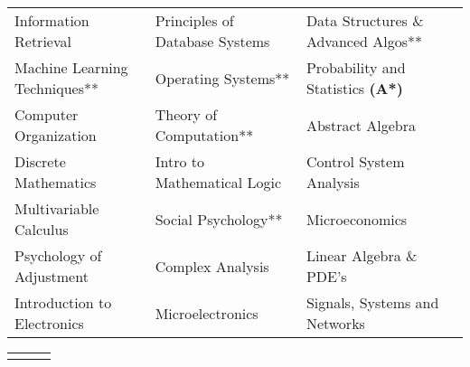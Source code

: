  {\fontsize{11pt}{1em}\bodyfontlight\upshape\color{text}
\begin{tabular*}{\textwidth}{L{\textwidth/3 - 0.5 cm} L{\textwidth/3 - 0.5 cm} L{\textwidth/3}}
  Information Retrieval & Principles of Database Systems & Data Structures \& Advanced Algos**\\
  Machine Learning Techniques** & Operating Systems** & Probability and Statistics \textbf{(A*)} \\
  Computer Organization & Theory of Computation** & Abstract Algebra \\
  Discrete Mathematics & Intro to Mathematical Logic & Control System Analysis \\
  Multivariable Calculus & Social Psychology** & Microeconomics  \\
  Psychology of Adjustment & Complex Analysis & Linear Algebra \& PDE's  \\
  Introduction to Electronics & Microelectronics & Signals, Systems and Networks\\
  
\end{tabular*}
\fontsize{10pt}{1em}\footerfont\upshape\color{text}
\begin{tabular*}{\textwidth}{L{8.4cm} L{3cm} L{3.5cm}}
   &  & \\
\end{tabular*}
\vspace{-6mm}
}
